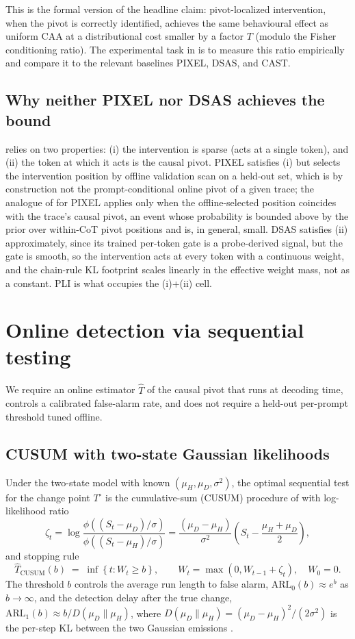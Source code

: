 \documentclass[11pt]{article}
\theoremstyle{definition}
\newcommand{\1}{\mathbf{1}}
\begin{document}
This is the formal version of the headline claim: pivot-localized intervention, when the pivot is correctly identified, achieves the same behavioural effect as uniform CAA at a distributional cost smaller by a factor $T$ (modulo the Fisher conditioning ratio). The experimental task in  is to measure this ratio empirically and compare it to the relevant baselines PIXEL, DSAS, and CAST.

\subsection{Why neither PIXEL nor DSAS achieves the bound}

 relies on two properties: (i) the intervention is sparse (acts at a single token), and (ii) the token at which it acts is the causal pivot. PIXEL satisfies (i) but selects the intervention position by offline validation scan on a held-out set, which is by construction not the prompt-conditional online pivot of a given trace; the analogue of  for PIXEL applies only when the offline-selected position coincides with the trace's causal pivot, an event whose probability is bounded above by the prior over within-CoT pivot positions and is, in general, small. DSAS satisfies (ii) approximately, since its trained per-token gate is a probe-derived signal, but the gate is smooth, so the intervention acts at every token with a continuous weight, and the chain-rule KL footprint scales linearly in the effective weight mass, not as a constant. PLI is what occupies the (i)+(ii) cell.

\section{Online detection via sequential testing}
\label{sec:online}

We require an online estimator $\widehat{T}$ of the causal pivot that runs at decoding time, controls a calibrated false-alarm rate, and does not require a held-out per-prompt threshold tuned offline.

\subsection{CUSUM with two-state Gaussian likelihoods}

Under the two-state model with known $(\mu_H, \mu_D, \sigma^2)$, the optimal sequential test for the change point $T^{\circ}$ is the cumulative-sum (CUSUM) procedure of \citet{page1954cusum,lorden1971} with log-likelihood ratio
\[
\zeta_t = \log \frac{\phi((S_t - \mu_D)/\sigma)}{\phi((S_t - \mu_H)/\sigma)} = \frac{(\mu_D - \mu_H)}{\sigma^2}\!\left( S_t - \frac{\mu_H + \mu_D}{2} \right),
\]
and stopping rule
\[
\widehat{T}_{\mathrm{CUSUM}}(b) \;=\; \inf\!\left\{ t : W_t \ge b \right\}, \qquad W_t = \max(0, W_{t-1} + \zeta_t), \quad W_0 = 0.
\]
The threshold $b$ controls the average run length to false alarm, $\mathrm{ARL}_{0}(b) \approx e^{b}$ as $b \to \infty$, and the detection delay after the true change, $\mathrm{ARL}_{1}(b) \approx b / D(\mu_D \| \mu_H)$, where $D(\mu_D \| \mu_H) = (\mu_D - \mu_H)^2 / (2\sigma^2)$ is the per-step KL between the two Gaussian emissions \citep{lorden1971}.
\end{document}
